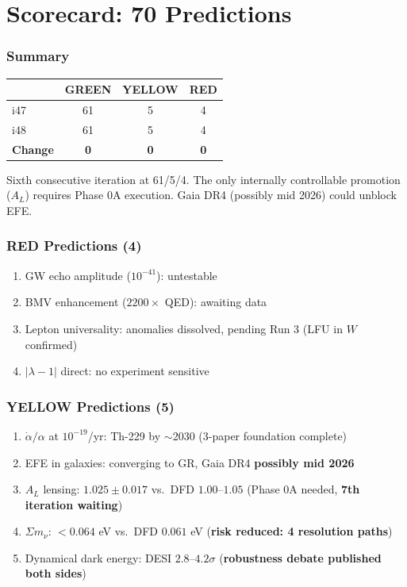 \documentclass[11pt,a4paper]{article}
\newcommand{\GREEN}{\textcolor{dfdgreen}{\textbf{GREEN}}}
\newcommand{\YELLOW}{\textcolor{dfdyellow}{\textbf{YELLOW}}}
\newcommand{\RED}{\textcolor{dfdred}{\textbf{RED}}}
\begin{document}
\part{Scorecard: 70 Predictions}

\section{Summary}

\begin{center}
\begin{tabular}{lccc}
\toprule
& \textbf{\GREEN} & \textbf{\YELLOW} & \textbf{\RED} \\
\midrule
i47 & 61 & 5 & 4 \\
i48 & 61 & 5 & 4 \\
\textbf{Change} & \textbf{0} & \textbf{0} & \textbf{0} \\
\bottomrule
\end{tabular}
\end{center}

Sixth consecutive iteration at 61/5/4. The only internally controllable promotion ($A_L$) requires Phase 0A execution. Gaia DR4 (possibly mid 2026) could unblock EFE.

\section{RED Predictions (4)}

\begin{enumerate}
\item GW echo amplitude ($10^{-41}$): untestable
\item BMV enhancement ($2200\times$ QED): awaiting data
\item Lepton universality: anomalies dissolved, pending Run 3 (LFU in $W$ confirmed)
\item $|\lambda-1|$ direct: no experiment sensitive
\end{enumerate}

\section{YELLOW Predictions (5)}

\begin{enumerate}
\item $\dot{\alpha}/\alpha$ at $10^{-19}$/yr: Th-229 by $\sim$2030 (3-paper foundation complete)
\item EFE in galaxies: converging to GR, Gaia DR4 \textbf{possibly mid 2026}
\item $A_L$ lensing: $1.025 \pm 0.017$ vs.\ DFD $1.00$--$1.05$ (Phase 0A needed, \textbf{7th iteration waiting})
\item $\Sigma m_\nu$: $< 0.064$ eV vs.\ DFD $0.061$ eV (\textbf{risk reduced: 4 resolution paths})
\item Dynamical dark energy: DESI $2.8$--$4.2\sigma$ (\textbf{robustness debate published both sides})
\end{enumerate}
\end{document}
